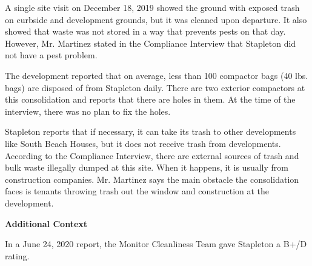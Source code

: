 A single site visit on December 18, 2019 showed the ground with exposed trash on curbside and development grounds, but it was cleaned upon departure. It also showed that waste was not stored in a way that prevents pests on that day. However, Mr. Martinez stated in the Compliance Interview that Stapleton did not have a pest problem. 

The development reported that on average, less than 100  compactor bags (40 lbs. bags)  are disposed of from Stapleton daily. There are two exterior compactors at this consolidation and reports that there are holes in them. At the time of the interview, there was no plan to fix the holes. 

Stapleton reports that if necessary, it can take its trash to other developments like South Beach Houses, but it does not receive trash from developments. According to the Compliance Interview, there are external sources of trash and bulk waste illegally dumped at this site. When it happens, it is usually from construction companies. Mr. Martinez says the main obstacle the consolidation faces is tenants throwing trash out the window and construction at the development.  

\textbf{Additional Context}

In a June 24, 2020 report, the Monitor Cleanliness Team gave Stapleton a B+/D rating.  
